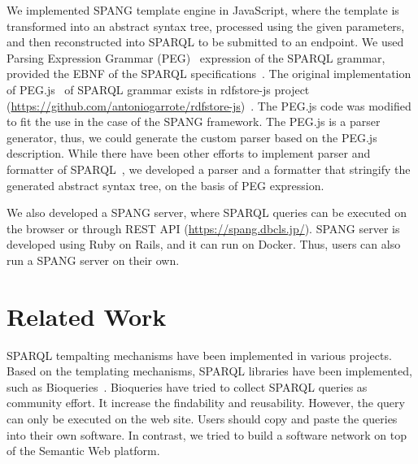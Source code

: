 \documentclass[runningheads]{llncs}
\begin{document}
We implemented SPANG template engine in JavaScript, where the template is transformed into an abstract syntax tree, processed using the given parameters, and then reconstructed into SPARQL to be submitted to an endpoint. 
We used Parsing Expression Grammar (PEG)~\cite{peg} expression of the SPARQL grammar, provided the EBNF of the SPARQL specifications~\cite{sparql}. The original implementation of PEG.js~\cite{pegjs} of SPARQL grammar exists in rdfstore-js project (\url{https://github.com/antoniogarrote/rdfstore-js})~\cite{rdfstore-js}.
The PEG.js code was modified to fit the use in the case of the SPANG framework.
The PEG.js is a parser generator, thus, we could generate the custom parser based on the PEG.js description. 
While there have been other efforts to implement parser and formatter of SPARQL~\cite{sparql-js}, we developed a parser and a formatter that stringify the generated abstract syntax tree, on the basis of PEG expression. %

We also developed a SPANG server, where SPARQL queries can be executed on the browser or through REST API (\url{https://spang.dbcls.jp/}).
SPANG server is developed using Ruby on Rails, and it can run on Docker.
Thus, users can also run a SPANG server on their own. 

\section{Related Work}

SPARQL tempalting mechanisms have been implemented in various projects. Based on the templating mechanisms, SPARQL libraries have been implemented, such as Bioqueries~\cite{bioqueries}. Bioqueries have tried to collect SPARQL queries as community effort. It increase the findability and reusability.
However, the query can only be executed on the web site.
Users should copy and paste the queries into their own software.
In contrast, we tried to build a software network on top of the Semantic Web platform.
\end{document}
